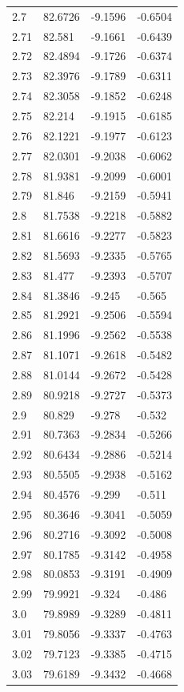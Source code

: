 \begin{tabular}{llll}
2.7 & 82.6726 & -9.1596 & -0.6504 \\
2.71 & 82.581 & -9.1661 & -0.6439 \\
2.72 & 82.4894 & -9.1726 & -0.6374 \\
2.73 & 82.3976 & -9.1789 & -0.6311 \\
2.74 & 82.3058 & -9.1852 & -0.6248 \\
2.75 & 82.214 & -9.1915 & -0.6185 \\
2.76 & 82.1221 & -9.1977 & -0.6123 \\
2.77 & 82.0301 & -9.2038 & -0.6062 \\
2.78 & 81.9381 & -9.2099 & -0.6001 \\
2.79 & 81.846 & -9.2159 & -0.5941 \\
2.8 & 81.7538 & -9.2218 & -0.5882 \\
2.81 & 81.6616 & -9.2277 & -0.5823 \\
2.82 & 81.5693 & -9.2335 & -0.5765 \\
2.83 & 81.477 & -9.2393 & -0.5707 \\
2.84 & 81.3846 & -9.245 & -0.565 \\
2.85 & 81.2921 & -9.2506 & -0.5594 \\
2.86 & 81.1996 & -9.2562 & -0.5538 \\
2.87 & 81.1071 & -9.2618 & -0.5482 \\
2.88 & 81.0144 & -9.2672 & -0.5428 \\
2.89 & 80.9218 & -9.2727 & -0.5373 \\
2.9 & 80.829 & -9.278 & -0.532 \\
2.91 & 80.7363 & -9.2834 & -0.5266 \\
2.92 & 80.6434 & -9.2886 & -0.5214 \\
2.93 & 80.5505 & -9.2938 & -0.5162 \\
2.94 & 80.4576 & -9.299 & -0.511 \\
2.95 & 80.3646 & -9.3041 & -0.5059 \\
2.96 & 80.2716 & -9.3092 & -0.5008 \\
2.97 & 80.1785 & -9.3142 & -0.4958 \\
2.98 & 80.0853 & -9.3191 & -0.4909 \\
2.99 & 79.9921 & -9.324 & -0.486 \\
3.0 & 79.8989 & -9.3289 & -0.4811 \\
3.01 & 79.8056 & -9.3337 & -0.4763 \\
3.02 & 79.7123 & -9.3385 & -0.4715 \\
3.03 & 79.6189 & -9.3432 & -0.4668 \\

\end{tabular}
